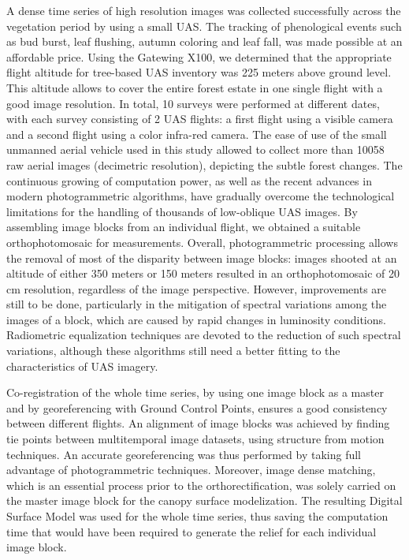 \documentclass[remotesensing,article,submit,moreauthors,pdftex,12pt,a4paper]{mdpi} %
\begin{document}
A dense time series of high resolution images was collected successfully across the vegetation period by using a small UAS. 
The tracking of phenological events such as bud burst, leaf flushing, autumn coloring and leaf fall, was made possible at an affordable price. 
Using the Gatewing X100, we determined that the appropriate flight altitude for tree-based UAS inventory was 225 meters above ground level. 
This altitude allows to cover the entire forest estate in one single flight with a good image resolution. 
In total, 10 surveys were performed at different dates, with each survey consisting of 2 UAS flights: a first flight using a visible camera and a second flight using a color infra-red camera. 
The ease of use of the small unmanned aerial vehicle used in this study allowed to collect more than 10058 raw aerial images (decimetric resolution), depicting the subtle forest changes. 
The continuous growing of computation power, as well as the recent advances in modern photogrammetric algorithms, have gradually overcome the technological limitations for the handling of thousands of low-oblique UAS images. 
By assembling image blocks from an individual flight, we obtained a suitable orthophotomosaic for measurements. 
Overall, photogrammetric processing allows the removal of most of the disparity between image blocks: images shooted at an altitude of either 350 meters or 150 meters resulted in an orthophotomosaic of 20 cm resolution, regardless of the image perspective.
However, improvements are still to be done, particularly in the mitigation of spectral variations among the images of a block, which are caused by rapid changes in luminosity conditions.
Radiometric equalization techniques are devoted to the reduction of such spectral variations, although these algorithms still need a better fitting to the characteristics of UAS imagery.

Co-registration of the whole time series, by using one image block as a master and by georeferencing with Ground Control Points, ensures a good consistency between different flights. 
An alignment of image blocks was achieved by finding tie points between multitemporal image datasets, using structure from motion techniques. 
An accurate georeferencing was thus performed by taking full advantage of photogrammetric techniques.
Moreover, image dense matching, which is an essential process prior to the orthorectification, was solely carried on the master image block for the canopy surface modelization.
The resulting Digital Surface Model was used for the whole time series, thus saving the computation time that would have been required to generate the relief for each individual image block.
\end{document}
